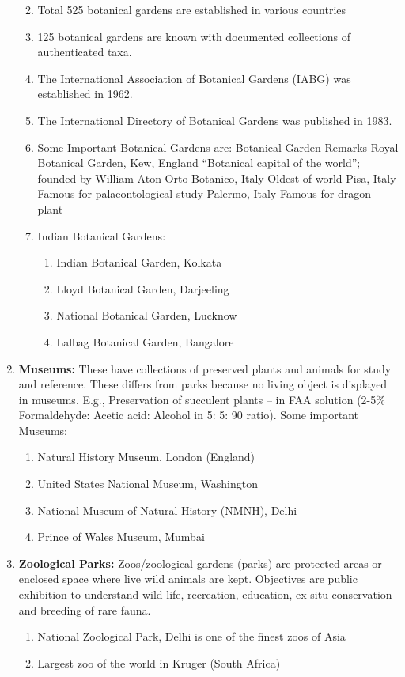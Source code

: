 \documentclass[
]{book}
\providecommand{\tightlist}{%
  \setlength{\itemsep}{0pt}\setlength{\parskip}{0pt}}
\begin{document}
\begin{enumerate}
  \begin{enumerate}
  \def\labelenumii{\roman{enumii})}
  \item
    Total 525 botanical gardens are established in various countries
  \item
    125 botanical gardens are known with documented collections of authenticated taxa.
  \item
    The International Association of Botanical Gardens (IABG) was established in 1962.
  \item
    The International Directory of Botanical Gardens was published in 1983.
  \item
    Some Important Botanical Gardens are: Botanical Garden Remarks Royal Botanical Garden, Kew, England ``Botanical capital of the world''; founded by William Aton Orto Botanico, Italy Oldest of world Pisa, Italy Famous for palaeontological study Palermo, Italy Famous for dragon plant
  \item
    Indian Botanical Gardens:

    \begin{enumerate}
    \def\labelenumiii{\alph{enumiii})}
    \tightlist
    \item
      Indian Botanical Garden, Kolkata
    \item
      Lloyd Botanical Garden, Darjeeling
    \item
      National Botanical Garden, Lucknow
    \item
      Lalbag Botanical Garden, Bangalore
    \end{enumerate}
  \end{enumerate}
\item
  \textbf{Museums:} These have collections of preserved plants and animals for study and reference. These differs from parks because no living object is displayed in museums. E.g., Preservation of succulent plants -- in FAA solution (2-5\% Formaldehyde: Acetic acid: Alcohol in 5: 5: 90 ratio). Some important Museums:

  \begin{enumerate}
  \def\labelenumii{\roman{enumii})}
  \tightlist
  \item
    Natural History Museum, London (England)
  \item
    United States National Museum, Washington
  \item
    National Museum of Natural History (NMNH), Delhi
  \item
    Prince of Wales Museum, Mumbai
  \end{enumerate}
\item
  \textbf{Zoological Parks:} Zoos/zoological gardens (parks) are protected areas or enclosed space where live wild animals are kept. Objectives are public exhibition to understand wild life, recreation, education, ex-situ conservation and breeding of rare fauna.

  \begin{enumerate}
  \def\labelenumii{\roman{enumii})}
  \tightlist
  \item
    National Zoological Park, Delhi is one of the finest zoos of Asia
  \item
    Largest zoo of the world in Kruger (South Africa)
  \end{enumerate}
\end{enumerate}

  
\end{document}
